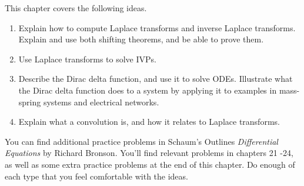 \noindent This chapter covers the following ideas.

\begin{enumerate}

\item Explain how to compute Laplace transforms and inverse Laplace transforms. Explain and use both shifting theorems, and be able to prove them. 
\item Use Laplace transforms to solve IVPs.
\item Describe the Dirac delta function, and use it to solve ODEs. Illustrate what the Dirac delta function does to a system by applying it to examples in mass-spring systems and electrical networks.
\item Explain what a convolution is, and how it relates to Laplace transforms.

\end{enumerate}

You can find additional practice problems in Schaum's Outlines \textit{Differential Equations} by Richard Bronson.
You'll find relevant problems in chapters 21 -24, as well as some extra practice problems at the end of this chapter. 
Do enough of each type that you feel comfortable with the ideas. 

